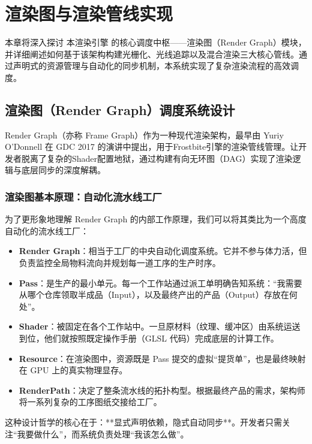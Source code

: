 
\chapter{渲染图与渲染管线实现}
\label{sec:render_graph}

本章将深入探讨 本渲染引擎 的核心调度中枢——渲染图（Render Graph）模块，并详细阐述如何基于该架构构建光栅化、光线追踪以及混合渲染三大核心管线。通过声明式的资源管理与自动化的同步机制，本系统实现了复杂渲染流程的高效调度。

\section{渲染图（Render Graph）调度系统设计}

Render Graph（亦称 Frame Graph）作为一种现代渲染架构，最早由 Yuriy O'Donnell 在 GDC 2017 的演讲中提出，用于Frostbite引擎的渲染管线管理。让开发者脱离了复杂的Shader配置地狱，通过构建有向无环图（DAG）实现了渲染逻辑与底层同步的深度解耦。

\subsection{渲染图基本原理：自动化流水线工厂}
为了更形象地理解 Render Graph 的内部工作原理，我们可以将其类比为一个高度自动化的流水线工厂：

\begin{itemize}
    \item \textbf{Render Graph}：相当于工厂的中央自动化调度系统。它并不参与体力活，但负责监控全局物料流向并规划每一道工序的生产时序。
    \item \textbf{Pass}：是生产的最小单元。每一个工作站通过派工单明确告知系统：“我需要从哪个仓库领取半成品（Input），以及最终产出的产品（Output）存放在何处”。
    \item \textbf{Shader}：被固定在各个工作站中。一旦原材料（纹理、缓冲区）由系统运送到位，他们就按照既定操作手册（GLSL 代码）完成底层的计算工作。
    \item \textbf{Resource}：在渲染图中，资源既是 Pass 提交的虚拟“提货单”，也是最终映射在 GPU 上的真实物理显存。
    \item \textbf{RenderPath}：决定了整条流水线的拓扑构型。根据最终产品的需求，架构师将一系列复杂的工序图纸交接给工厂。
\end{itemize}

这种设计哲学的核心在于：**显式声明依赖，隐式自动同步**。开发者只需关注“我要做什么”，而系统负责处理“我该怎么做”。

